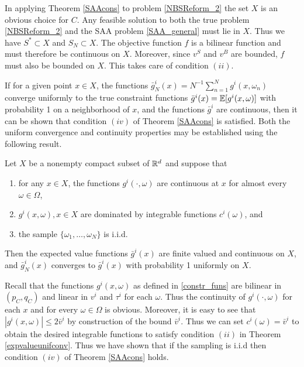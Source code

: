 In applying Theorem \ref{SAAcons} to problem \eqref{NBSReform_2} the set $X$ is an obvious choice for $C$. Any feasible solution to both the true
problem \eqref{NBSReform_2} and the SAA problem \eqref{SAA_general} must lie in
$X$. Thus we have $S^* \subset X$ and $S_N \subset X$. 
The objective function $f$ is a bilinear function and must therefore be continuous
on $X$. Moreover, since $v^S$ and $v^B$ are bounded, $f$ must also be bounded on
$X$. This takes care of condition $(ii)$.

If for a given point $x \in X$, the functions
$\bar{g}_N^i(x) = N^{-1} \sum_{n=1}^N g^i(x, \omega_n)$ converge uniformly to
the true constraint functions $\bar{g}^i(x) = \mathbb{E}[g^i(x,\omega)]$ with
probability 1 on a neighborhood of $x$, and the functions $\bar{g}^i$ are
continuous, then it can be shown that condition $(iv)$ of Theorem \ref{SAAcons} is satisfied. Both the
uniform convergence and continuity properties may be established using the
following result.

\begin{theorem} \label{expvalueunifconv} \citep{shapiro_lectures_2009}
	Let $X$ be a nonempty compact subset of $\mathbb R^d$ and suppose that 
	\begin{enumerate}[label=(\roman*)]
		\item{for any $x \in X$, the functions $g^i(\cdot,\omega)$ are continuous at $x$ for
			almost every $\omega \in \Omega$,}
		\item{$g^i(x,\omega), x \in X$ are dominated by integrable functions
			$c^i(\omega)$, and}
		\item{the sample $\{ \omega_1, \ldots, \omega_N\}$ is i.i.d.}
	\end{enumerate}
	Then the expected value functions $\bar{g}^i(x)$ are finite valued and continuous
	on $X$, and $\bar{g}^i_N(x)$ converges to $\bar{g}^i(x)$ with probability 1
	uniformly on $X$.
\end{theorem}

Recall that the functions $g^i(x,\omega)$ as defined in \eqref{constr_funs} are
bilinear in $(p_C, q_C)$ and linear in $v^i$ and $\tau^i$ for each $\omega$.
Thus the continuity of $g^i(\cdot, \omega)$ for each $x$ and for every $\omega
\in \Omega$ is obvious. Moreover, it is easy to see that $| g^i(x, \omega) |
\leq 2 \bar{v}^i$ by construction of the bound $\bar{v}^i$. Thus we can set
$c^i(\omega) = \bar{v}^i$ to obtain the desired integrable functions to satisfy
condition $(ii)$ in Theorem \ref{expvalueunifconv}. Thus we have shown that if
the sampling is i.i.d then condition $(iv)$ of Theorem \ref{SAAcons} holds.

